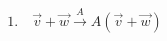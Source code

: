 \documentclass[preview]{standalone}
\begin{document}
\begin{align*}
1.\quad \vec{v}+\vec{w}\xrightarrow{A}A(\vec{v}+\vec{w})
\end{align*}
\end{document}
